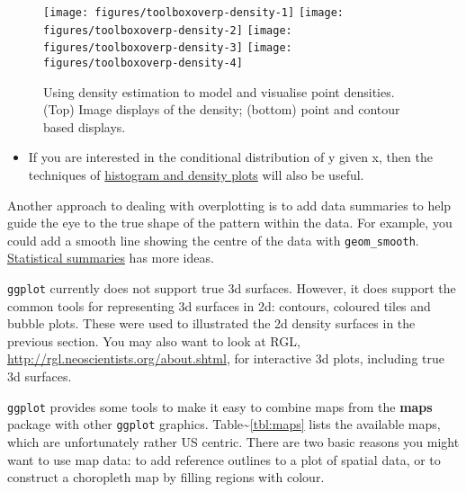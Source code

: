 \begin{figure}
\texttt{[image: figures/toolboxoverp-density-1]} \texttt{[image: figures/toolboxoverp-density-2]} \texttt{[image: figures/toolboxoverp-density-3]} \texttt{[image: figures/toolboxoverp-density-4]} \caption{Using density estimation to model and visualise point densities.  (Top) Image displays of the density; (bottom) point and contour based displays.\label{fig:overp-density}}
\end{figure}

\begin{itemize}
\itemsep1pt\parskip0pt
\item
  If you are interested in the conditional distribution of y given x,
  then the techniques of \hyperref[sub:distribution]{histogram and
  density plots} will also be useful.
\end{itemize}

Another approach to dealing with overplotting is to add data summaries
to help guide the eye to the true shape of the pattern within the data.
For example, you could add a smooth line showing the centre of the data
with \texttt{geom\_smooth}. \hyperref[sec:summary]{Statistical
summaries} has more ideas.


\texttt{ggplot} currently does not support true 3d surfaces. However, it
does support the common tools for representing 3d surfaces in 2d:
contours, coloured tiles and bubble plots. These were used to
illustrated the 2d density surfaces in the previous section. You may
also want to look at RGL,
\url{http://rgl.neoscientists.org/about.shtml}, for interactive 3d
plots, including true 3d surfaces. 


\texttt{ggplot} provides some tools to make it easy to combine maps from
the \textbf{maps} package with other \texttt{ggplot} graphics.
Table\textasciitilde{}\ref{tbl:maps} lists the available maps, which are
unfortunately rather US centric. There are two basic reasons you might
want to use map data: to add reference outlines to a plot of spatial
data, or to construct a choropleth map by filling regions with colour.

